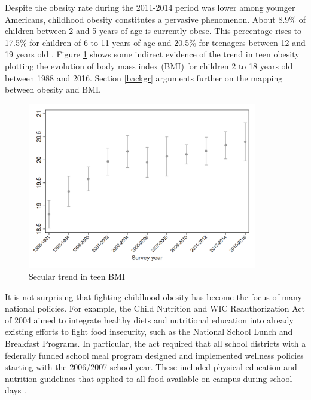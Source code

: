 \documentclass[twoside,12pt]{article}
\begin{document}
Despite the obesity rate during the 2011-2014 period was lower among younger Americans, childhood obesity constitutes a pervasive phenomenon. About 8.9\% of children between 2 and 5 years of age is currently obese. This percentage rises to 17.5\% for children of 6 to 11 years of age and 20.5\% for teenagers between 12 and 19 years old \citep{ogden2015prevalence}. Figure \ref{fig:secular_bmi} shows some indirect evidence of the trend in teen obesity plotting the evolution of body mass index (BMI) for children 2 to 18 years old between 1988 and 2016. Section \ref{backgr} arguments further on the mapping between obesity and BMI.
\begin{figure}[htp]
  \centering
  \caption{Secular trend in teen BMI}
  \label{fig:secular_bmi}
  \includegraphics[width=100mm]{Trends_in_obesity_nhanes/output/bmi_2to18_nhanes.png}
\end{figure}

It is not surprising that fighting childhood obesity has become the focus of many national policies. For example, the Child Nutrition and WIC Reauthorization Act of 2004 aimed to integrate healthy diets and nutritional education into already existing efforts to fight food insecurity, such as the National School Lunch and Breakfast Programs. In particular, the act required that all school districts with a federally funded school meal program designed and implemented wellness policies starting with the 2006/2007 school year. These included physical education and nutrition guidelines that applied to all food available on campus during school days \citep{bauhoff2014effect}.
\end{document}

